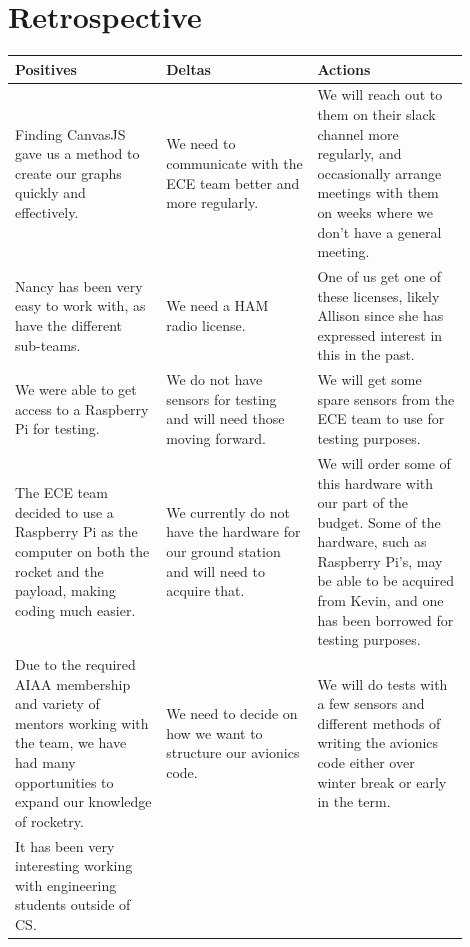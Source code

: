 \documentclass[onecolumn, draftclsnofoot, 10pt, compsoc]{IEEEtran}
\begin{document}

\newpage
\section{Retrospective}
\begin{tabular}{ | p{0.3\linewidth} | p{0.3\linewidth} | p{0.3\linewidth} | }
\hline
Positives&
Deltas&
Actions\\\hline
Finding CanvasJS gave us a method to create our graphs quickly and effectively.&
We need to communicate with the ECE team better and more regularly.&
We will reach out to them on their slack channel more regularly, and occasionally arrange meetings with them on weeks where we don’t have a general meeting.\\\hline

Nancy has been very easy to work with, as have the different sub-teams.&
We need a HAM radio license.&
One of us get one of these licenses, likely Allison since she has expressed interest in this in the past.\\\hline

We were able to get access to a Raspberry Pi for testing.&
We do not have sensors for testing and will need those moving forward.&
We will get some spare sensors from the ECE team to use for testing purposes.\\\hline

The ECE team decided to use a Raspberry Pi as the computer on both the rocket and the payload, making coding much easier.&
We currently do not have the hardware for our ground station and will need to acquire that.&
We will order some of this hardware with our part of the budget. Some of the hardware, such as Raspberry Pi’s, may be able to be acquired from Kevin, and one has been borrowed for testing purposes.\\\hline

Due to the required AIAA membership and variety of mentors working with the team, we have had many opportunities to expand our knowledge of rocketry.&
We need to decide on how we want to structure our avionics code.&
We will do tests with a few sensors and different methods of writing the avionics code either over winter break or early in the term.\\\hline

It has been very interesting working with engineering students outside of CS.&&\\\hline
\end{tabular}



\newpage
\end{document}
